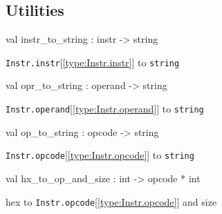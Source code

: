 \documentclass[11pt]{article}
\begin{document}
\subsection{Utilities}




\label{val:Instr.instr-underscoreto-underscorestring}\begin{ocamldoccode}
val instr_to_string : instr -> string
\end{ocamldoccode}
\begin{ocamldocdescription}
{\tt{Instr.instr}}[\ref{type:Instr.instr}] to {\tt{string}}


\end{ocamldocdescription}




\label{val:Instr.opr-underscoreto-underscorestring}\begin{ocamldoccode}
val opr_to_string : operand -> string
\end{ocamldoccode}
\begin{ocamldocdescription}
{\tt{Instr.operand}}[\ref{type:Instr.operand}] to {\tt{string}}


\end{ocamldocdescription}




\label{val:Instr.op-underscoreto-underscorestring}\begin{ocamldoccode}
val op_to_string : opcode -> string
\end{ocamldoccode}
\begin{ocamldocdescription}
{\tt{Instr.opcode}}[\ref{type:Instr.opcode}] to {\tt{string}}


\end{ocamldocdescription}




\label{val:Instr.hx-underscoreto-underscoreop-underscoreand-underscoresize}\begin{ocamldoccode}
val hx_to_op_and_size : int -> opcode * int
\end{ocamldoccode}
\begin{ocamldocdescription}
hex to {\tt{Instr.opcode}}[\ref{type:Instr.opcode}] and size


\end{ocamldocdescription}
\end{document}
